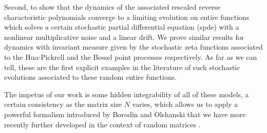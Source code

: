 \documentclass[]{article}
\begin{document}
Second, to show that the dynamics of the associated rescaled reverse characteristic polynomials converge to a limiting evolution on entire functions which solves a certain stochastic partial differential equation (spde) with a nonlinear multiplicative noise and a linear drift. We prove similar results for dynamics with invariant measure given by the stochastic zeta functions associated to the Hua-Pickrell and the Bessel point processes \cite{ChhaibiNajnudelNikeghbali,ValkoVirag2,LiValko,Theo-RandomEntireFunctions} respectively. As far as we can tell, these are the first explicit examples in the literature of such stochastic evolutions associated to these random entire functions.

The impetus of our work is some hidden integrability of all of these models, a certain consistency as the matrix size $N$ varies, which allows us to apply a powerful formalism introduced by Borodin and Olshanski \cite{BorodinOlshanskiMarkov,BorodinOlshanskiThoma,OlshanskiLectureNotes,OlshanskiICM} that we have more recently further developed in the context of random matrices \cite{HuaPickrellDiffusions,AM24}.
\end{document}
